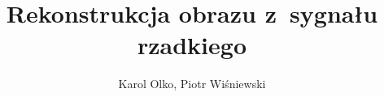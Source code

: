 \documentclass[12pt]{article}
\newcommand{\<}{\langle}
\renewcommand{\>}{\rangle}
\begin{document}
\author{Karol Olko, Piotr Wiśniewski}
\title{\huge{Rekonstrukcja obrazu z~sygnału rzadkiego}}
\maketitle
\newpage{}

\tableofcontents{}
\newpage{}

\newpage{}

\newpage{}

\newpage{}





\cleardoublepage

\listoffigures{}

\newpage{}

\nocite{*}



\begin{appendices}




\end{appendices}
\end{document}
